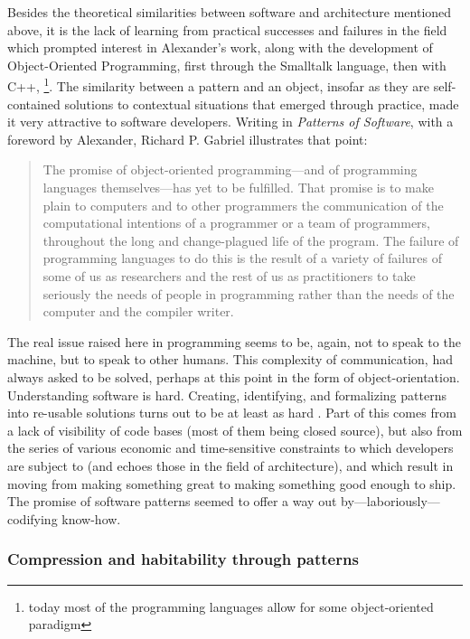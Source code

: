 Besides the theoretical similarities between software and architecture mentioned above, it is the lack of learning from practical successes and failures in the field which prompted interest in Alexander's work, along with the development of Object-Oriented Programming, first through the Smalltalk language, then with C++, \footnote{today most of the programming languages allow for some object-oriented paradigm}. The similarity between a pattern and an object, insofar as they are self-contained solutions to contextual situations that emerged through practice, made it very attractive to software developers. Writing in \emph{Patterns of Software}, with a foreword by Alexander, Richard P. Gabriel illustrates that point:

\begin{quote}
  The promise of object-oriented programming—and of programming languages themselves—has yet to be fulfilled. That promise is to make plain to computers and to other programmers the communication of the computational intentions of a programmer or a team of programmers, throughout the long and change-plagued life of the program. The failure of programming languages to do this is the result of a variety of failures of some of us as researchers and the rest of us as practitioners to take seriously the needs of people in programming rather than the needs of the computer and the compiler writer. \citep{gabriel_patterns_1998}
\end{quote}

The real issue raised here in programming seems to be, again, not to speak to the machine, but to speak to other humans. This complexity of communication, had always asked to be solved, perhaps at this point in the form of object-orientation. Understanding software is hard. Creating, identifying, and formalizing patterns into re-usable solutions turns out to be at least as hard \citep{taylor_patterns_2001}. Part of this comes from a lack of visibility of code bases (most of them being closed source), but also from the series of various economic and time-sensitive constraints to which developers are subject to (and echoes those in the field of architecture), and which result in moving from making something great to making something good enough to ship. The promise of software patterns seemed to offer a way out by—laboriously—codifying know-how.

\subsubsection{Compression and habitability through patterns}
\label{subsubsec:compression-habitability}

